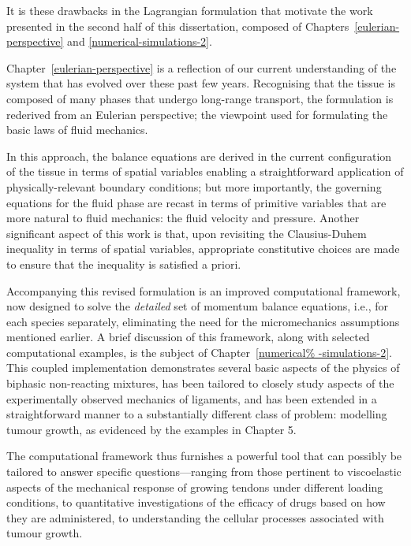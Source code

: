 It is these drawbacks in the Lagrangian formulation that motivate the
work presented in the second half of this dissertation, composed of
Chapters~\ref{eulerian-perspective} and \ref{numerical-simulations-2}.

Chapter~\ref{eulerian-perspective} is a reflection of our current
understanding of the system that has evolved over these past few
years. Recognising that the tissue is composed of many phases that
undergo long-range transport, the formulation is rederived from an
Eulerian perspective; the viewpoint used for formulating the basic
laws of fluid mechanics.

In this approach, the balance equations are derived in the current
configuration of the tissue in terms of spatial variables enabling a
straightforward application of physically-relevant boundary
conditions; but more importantly, the governing equations for the
fluid phase are recast in terms of primitive variables that are more
natural to fluid mechanics: the fluid velocity and pressure. Another
significant aspect of this work is that, upon revisiting the
Clausius-Duhem inequality in terms of spatial variables, appropriate
constitutive choices are made to ensure that the inequality is
satisfied a priori.

Accompanying this revised formulation is an improved computational
framework, now designed to solve the {\em detailed} set of momentum
balance equations, i.e., for each species separately, eliminating the
need for the micromechanics assumptions mentioned earlier. A brief
discussion of this framework, along with selected computational
examples, is the subject of Chapter~\ref{numerical%
  -simulations-2}. This coupled implementation demonstrates several
basic aspects of the physics of biphasic non-reacting mixtures, has
been tailored to closely study aspects of the experimentally observed
mechanics of ligaments, and has been extended in a straightforward
manner to a substantially different class of problem: modelling tumour
growth, as evidenced by the examples in Chapter 5.

The computational framework thus furnishes a powerful tool that can
possibly be tailored to answer specific questions---ranging from those
pertinent to viscoelastic aspects of the mechanical response of
growing tendons under different loading conditions, to quantitative
investigations of the efficacy of drugs based on how they are
administered, to understanding the cellular processes associated with
tumour growth.


